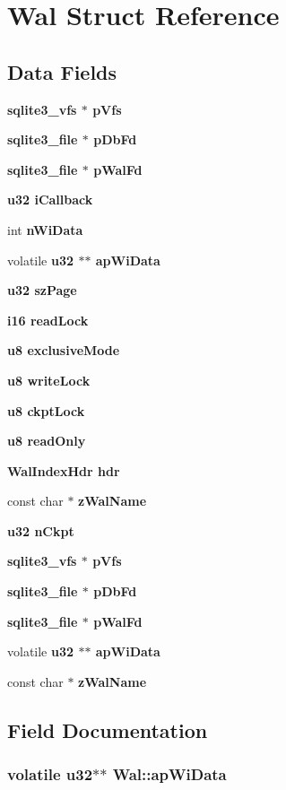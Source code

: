 \section{Wal Struct Reference}
\label{structWal}
\subsection*{Data Fields}
\begin{CompactItemize}
\item 
\bf{sqlite3\_\-vfs} $\ast$ \bf{p\-Vfs}
\item 
\bf{sqlite3\_\-file} $\ast$ \bf{p\-Db\-Fd}
\item 
\bf{sqlite3\_\-file} $\ast$ \bf{p\-Wal\-Fd}
\item 
\bf{u32} \bf{i\-Callback}
\item 
int \bf{n\-Wi\-Data}
\item 
volatile \bf{u32} $\ast$$\ast$ \bf{ap\-Wi\-Data}
\item 
\bf{u32} \bf{sz\-Page}
\item 
\bf{i16} \bf{read\-Lock}
\item 
\bf{u8} \bf{exclusive\-Mode}
\item 
\bf{u8} \bf{write\-Lock}
\item 
\bf{u8} \bf{ckpt\-Lock}
\item 
\bf{u8} \bf{read\-Only}
\item 
\bf{Wal\-Index\-Hdr} \bf{hdr}
\item 
const char $\ast$ \bf{z\-Wal\-Name}
\item 
\bf{u32} \bf{n\-Ckpt}
\item 
\bf{sqlite3\_\-vfs} $\ast$ \bf{p\-Vfs}
\item 
\bf{sqlite3\_\-file} $\ast$ \bf{p\-Db\-Fd}
\item 
\bf{sqlite3\_\-file} $\ast$ \bf{p\-Wal\-Fd}
\item 
volatile \bf{u32} $\ast$$\ast$ \bf{ap\-Wi\-Data}
\item 
const char $\ast$ \bf{z\-Wal\-Name}
\end{CompactItemize}


\subsection{Field Documentation}
\subsubsection{\setlength{\rightskip}{0pt plus 5cm}volatile \bf{u32}$\ast$$\ast$ \bf{Wal::ap\-Wi\-Data}}\label{structWal_bfed141d00e489fff9b3d240ef995dba}


